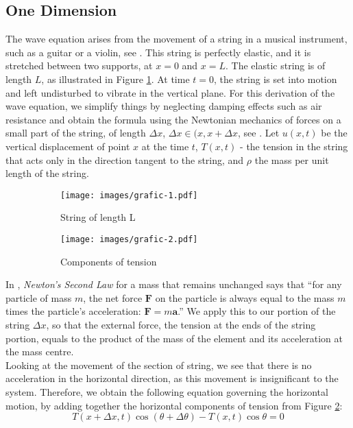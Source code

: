 \documentclass[a4paper, 12pt]{article}
\numberwithin{equation}{section}
\begin{document}
\subsection{One Dimension}
The wave equation arises from the movement of a string in a musical instrument,
such as a guitar or a violin, see \cite[Ch. 10, App. B]{BoyDiP}. This string is
perfectly elastic, and it is stretched between two supports, at $x=0$ and $x=L$.
The elastic string is of length $L$, as illustrated in Figure \ref{fig:1a}. At
time $t=0$, the string is set into motion and left undisturbed to vibrate in the
vertical plane. For this derivation of the wave equation, we simplify things by
neglecting damping effects such as air resistance and obtain the formula using
the Newtonian mechanics of forces on a small part of the string, of length
$\Delta x$, $\Delta x \in (x, x+\Delta x$, see \cite[Ch. 12.2]{Kr}. Let $u(x,t)$ be the
vertical displacement of point $x$ at the time $t$, $T(x,t)$ - the tension in
the string that acts only in the direction tangent to the string, and $\rho$ the
mass per unit length of the string. 
\begin{figure}[h] 
    \begin{subfigure}[t]{0.5\textwidth} 
        \texttt{[image: images/grafic-1.pdf]} 
        \caption{String of length L}
        \label{fig:1a}
    \end{subfigure} 
    \begin{subfigure}[t]{0.5\textwidth}
        \texttt{[image: images/grafic-2.pdf]}
        \caption{Components of tension}
        \label{fig:1b}
    \end{subfigure}     
\caption{}
\label{fig:1}
\end{figure}
In \cite[Ch. 1.4]{Tay}, \emph{Newton's Second Law} for a mass that remains
unchanged says that ``for any particle of mass $m$, the net force
$\boldsymbol{F}$ on the particle is always equal to the mass $m$ times the
particle's acceleration: $\boldsymbol{F} = m \boldsymbol{a}$.'' We apply this to
our portion of the string $\Delta x$, so that the external force, the tension at
the ends of the string portion, equals to the product of the mass of the element
and its acceleration at the mass centre. \\

Looking at the movement of the section of string, we see that there is no
acceleration in the horizontal direction, as this movement is insignificant to
the system. Therefore, we obtain the following equation governing the horizontal
motion, by adding together the horizontal components of tension from Figure
\ref{fig:1b}:
\begin {equation} \label{eq1}
    T(x+\Delta x,t)\cos{(\theta + \Delta \theta)}-T(x,t)\cos{\theta}=0
\end {equation}
\end{document}
